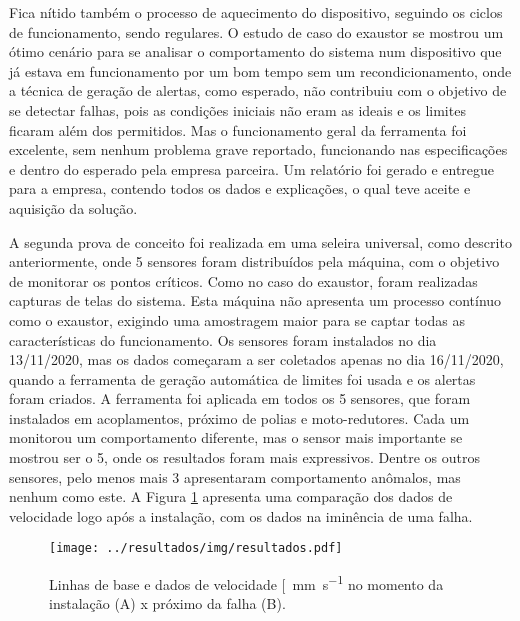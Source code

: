 \documentclass[a4paper]{ifacconf}
\begin{document}
Fica nítido também o processo de aquecimento do dispositivo, seguindo os ciclos de funcionamento, sendo regulares. O estudo de caso do 
exaustor se mostrou um ótimo cenário para se analisar o comportamento do sistema num dispositivo que já estava em funcionamento por um bom tempo 
sem um recondicionamento, onde a técnica de geração de alertas, como esperado, não contribuiu com o objetivo de se detectar falhas, pois as
condições iniciais não eram as ideais e os limites ficaram além dos permitidos. Mas o funcionamento geral da ferramenta foi excelente, sem nenhum
problema grave reportado, funcionando nas especificações e dentro do esperado pela empresa parceira. Um relatório foi gerado e entregue
para a empresa, contendo todos os dados e explicações, o qual teve aceite e aquisição da solução.

A segunda prova de conceito foi realizada em uma seleira universal, como descrito anteriormente, onde 5 sensores foram distribuídos pela máquina, com o 
objetivo de monitorar os pontos críticos. Como no caso do exaustor, foram realizadas capturas de telas do sistema. Esta máquina não apresenta
um processo contínuo como o exaustor, exigindo uma amostragem maior para se captar todas as características do funcionamento. 
Os sensores foram instalados no dia 13/11/2020, mas os dados começaram a ser coletados apenas no dia 16/11/2020, quando a 
ferramenta de geração automática de limites foi usada e os alertas foram criados. 
A ferramenta foi aplicada em todos os 5 sensores, que foram instalados em acoplamentos, próximo de polias e moto-redutores.
Cada um monitorou um comportamento diferente, mas o sensor mais importante se mostrou ser o 5, onde os resultados foram mais expressivos. 
Dentre os outros sensores, pelo menos mais 3 apresentaram comportamento anômalos, mas nenhum como este. A Figura \ref{fig:seleira_universal_antes_depois}
apresenta uma comparação dos dados de velocidade logo após a instalação, com os dados na iminência de uma falha.


\begin{figure}[h!]
  \begin{center}
      \texttt{[image: ../resultados/img/resultados.pdf]}
  \end{center}
  \caption{Linhas de base e dados de velocidade [\SI{}{\milli\metre\per\second} no momento da instalação
  (A) x próximo da falha (B).}
  \label{fig:seleira_universal_antes_depois}
\end{figure}
\end{document}
